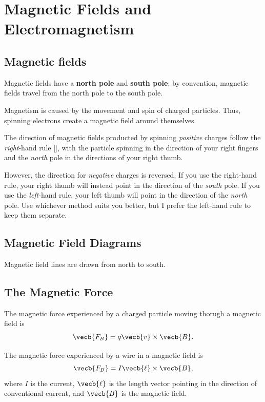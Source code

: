 \chapter{Magnetic Fields and Electromagnetism}

\section{Magnetic fields}

Magnetic fields have a \textbf{north pole} and \textbf{south pole};
by convention, magnetic fields travel from the north pole to the south pole.

Magnetism is caused by the movement and spin of charged particles.
Thus, spinning electrons create a magnetic field around themselves.

The direction of magnetic fields producted by spinning \emph{positive} charges
follow the \emph{right}-hand rule [],
with the particle spinning in the direction of your right fingers
and the \emph{north} pole in the directions of your right thumb.

However, the direction for \emph{negative} charges is reversed.
If you use the right-hand rule,
your right thumb will instead point in the direction of the \emph{south} pole.
If you use the \emph{left}-hand rule,
your left thumb will point in the direction of the \emph{north} pole.
Use whichever method suits you better,
but I prefer the left-hand rule to keep them separate.

\section{Magnetic Field Diagrams}

Magnetic field lines are drawn from north to south.

\section{The Magnetic Force}

The magnetic force experienced by a charged particle
moving thorugh a magnetic field is
\begin{equation}
    \vecb{F_B} = q \vecb{v} \times \vecb{B}.
\end{equation}

The magnetic force experienced by a wire in a magnetic field is
\begin{equation}
    \vecb{F_B} = I \vecb{\ell} \times \vecb{B},
\end{equation}
where \(I\) is the current,
\(\vecb{\ell}\) is the length vector
pointing in the direction of conventional current,
and \(\vecb{B}\) is the magnetic field.

